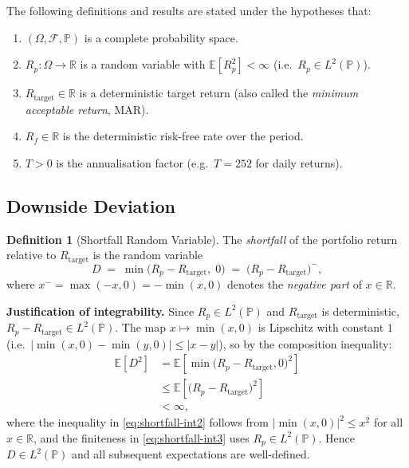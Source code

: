 \documentclass[12pt,openany]{book}
\newcommand{\E}{\mathbb{E}}
\numberwithin{equation}{chapter}
\theoremstyle{plain}
\theoremstyle{definition}
\newtheorem{definition}[theorem]{Definition}
\theoremstyle{remark}
\numberwithin{equation}{chapter}
\theoremstyle{plain}
\begin{document}
\noindent
The following definitions and results are stated under the hypotheses
that:
\begin{enumerate}
  \item $(\Omega,\mathcal{F},\mathbb{P})$ is a complete probability
        space.
  \item $R_p: \Omega \to \mathbb{R}$ is a random variable with
        $\E[R_p^{2}] < \infty$ (i.e.\ $R_p \in L^{2}(\mathbb{P})$).
  \item $R_{\mathrm{target}} \in \mathbb{R}$ is a deterministic
        target return (also called the \emph{minimum acceptable
        return}, MAR).
  \item $R_f \in \mathbb{R}$ is the deterministic risk-free rate
        over the period.
  \item $T > 0$ is the annualisation factor (e.g.\ $T = 252$ for
        daily returns).
\end{enumerate}

\subsection{Downside Deviation}

\begin{definition}[Shortfall Random Variable]
\label{def:shortfall}
The \emph{shortfall} of the portfolio return relative to
$R_{\mathrm{target}}$ is the random variable
\begin{equation}
  D \;=\; \min\!\bigl(R_p - R_{\mathrm{target}},\; 0\bigr)
       \;=\; \bigl(R_p - R_{\mathrm{target}}\bigr)^{-},
  \label{eq:shortfall}
\end{equation}
where $x^{-} = \max(-x, 0) = -\min(x, 0)$ denotes the
\emph{negative part} of $x \in \mathbb{R}$.

\noindent
\textbf{Justification of integrability.}
Since $R_p \in L^{2}(\mathbb{P})$ and $R_{\mathrm{target}}$ is
deterministic, $R_p - R_{\mathrm{target}} \in L^{2}(\mathbb{P})$.
The map $x \mapsto \min(x, 0)$ is Lipschitz with constant $1$
(i.e.\ $|\min(x,0) - \min(y,0)| \leq |x-y|$), so by the
composition inequality:
\begin{align}
  \E\!\left[D^{2}\right]
    &= \E\!\left[\min\!\bigl(R_p - R_{\mathrm{target}},0\bigr)^{2}\right]
  \label{eq:shortfall-int1} \\
    &\leq \E\!\left[\bigl(R_p - R_{\mathrm{target}}\bigr)^{2}\right]
  \label{eq:shortfall-int2} \\
    &< \infty,
  \label{eq:shortfall-int3}
\end{align}
where the inequality in \eqref{eq:shortfall-int2} follows from
$|\min(x,0)|^{2} \leq x^{2}$ for all $x \in \mathbb{R}$,
and the finiteness in \eqref{eq:shortfall-int3} uses
$R_p \in L^{2}(\mathbb{P})$.  Hence $D \in L^{2}(\mathbb{P})$
and all subsequent expectations are well-defined.
\end{definition}
\end{document}
